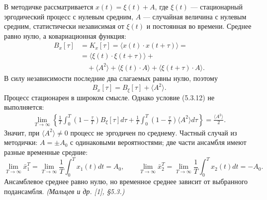 \documentclass[8pt]{extarticle}
\begin{document}
	В методичке рассматривается $x(t)=\xi(t)+A$, где $\xi(t)$ --- стационарный эргодический процесс с нулевым средним, $A$ --- случайная величина с нулевым средним, статистически независимая от $\xi(t)$ и постоянная во времени. Среднее равно нулю, а ковариационная функция:
	\[
	\boxed{\begin{aligned}
			B_x[\tau]&=K_x[\tau]=\langle x(t)\cdot x(t+\tau)\rangle=\\
			&=\langle\xi(t)\cdot\xi(t+\tau)\rangle+\\
			&\quad+\langle A^2\rangle+\langle\xi(t)\cdot A\rangle+
			\langle\xi(t+\tau)\cdot A\rangle.
	\end{aligned}}\tag{5.3.15}
	\]
	В силу независимости последние два слагаемых равны нулю, поэтому
	\[
	\boxed{B_x[\tau]=B_{\xi}[\tau]+\langle A^2\rangle.}\tag{5.3.16}
	\]
	Процесс стационарен в широком смысле. Однако условие (5.3.12) не выполняется:
	\begin{align} \tag{5.3.17}
		\boxed{\lim_{T\to\infty}\left\{
			\frac{1}{T}\int_0^T\left(1-\frac{\tau}{T}\right)B_{\xi}[\tau]d\tau+
			\frac{1}{T}\int_0^T\left(1-\frac{\tau}{T}\right)\langle A^2\rangle d\tau
			\right\}=\frac{\langle A^2\rangle}{2}.}
	\end{align}
	Значит, при $\langle A^2\rangle\neq0$ процесс не эргодичен по среднему. Частный случай из методички: $A=\pm A_0$ с одинаковыми вероятностями; две части ансамбля имеют разные временные средние:
	\[
	\boxed{\lim_{T\to\infty}\bar{x}_1^T=
		\lim_{T\to\infty}\frac{1}{T}\int_0^T x_1(t)dt=A_0,}\qquad
	\boxed{\lim_{T\to\infty}\bar{x}_2^T=
		\lim_{T\to\infty}\frac{1}{T}\int_0^T x_2(t)dt=-A_0.}
	\]
	Ансамблевое среднее равно нулю, но временное среднее зависит от выбранного подансамбля. \textit{(Мальцев и др. [1], §5.3.)}
	
\end{document}
